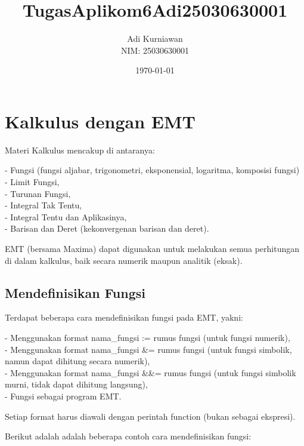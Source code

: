\documentclass{article}
\title{TugasAplikom6Adi25030630001}
\author{Adi Kurniawan \\ NIM: 25030630001}
\date{\today}
\newenvironment{eulernotebook}{\par}{\par}
\newcommand{\eulerheading}[1]{\section{#1}}
\newcommand{\eulersubheading}[1]{\subsection{#1}}
\newenvironment{eulercomment}{\par\medskip}{\par\medskip}
\begin{document}
\maketitle

\begin{eulernotebook}
\eulerheading{Kalkulus dengan EMT}
\begin{eulercomment}
Materi Kalkulus mencakup di antaranya:

- Fungsi (fungsi aljabar, trigonometri, eksponensial, logaritma, komposisi fungsi)\\
- Limit Fungsi,\\
- Turunan Fungsi,\\
- Integral Tak Tentu,\\
- Integral Tentu dan Aplikasinya,\\
- Barisan dan Deret (kekonvergenan barisan dan deret).

EMT (bersama Maxima) dapat digunakan untuk melakukan semua perhitungan di dalam kalkulus, baik secara numerik maupun analitik
(eksak).

\end{eulercomment}
\eulersubheading{Mendefinisikan Fungsi}
\begin{eulercomment}
Terdapat beberapa cara mendefinisikan fungsi pada EMT, yakni:

- Menggunakan format nama\_fungsi := rumus fungsi (untuk fungsi numerik),\\
- Menggunakan format nama\_fungsi \&= rumus fungsi (untuk fungsi simbolik, namun dapat dihitung secara numerik),\\
- Menggunakan format nama\_fungsi \&\&= rumus fungsi (untuk fungsi simbolik murni, tidak dapat dihitung langsung),\\
- Fungsi sebagai program EMT.

Setiap format harus diawali dengan perintah function (bukan sebagai ekspresi).

Berikut adalah adalah beberapa contoh cara mendefinisikan fungsi:


\end{eulercomment}
\end{eulernotebook}
\end{document}
